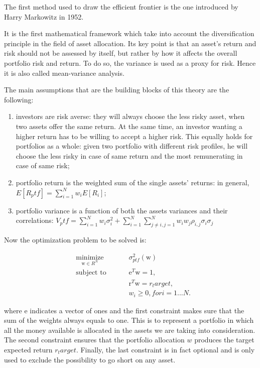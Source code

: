 The first method used to draw the efficient frontier is the one introduced by Harry Markowitz in 1952.

It is the first mathematical framework which take into account the diversification principle in the field of asset allocation. Its key point is that an asset's return and risk should not be assessed by itself, but rather by how it affects the overall portfolio risk and return. To do so, the variance is used as a proxy for risk. Hence it is also called mean-variance analysis.

The main assumptions that are the building blocks of this theory are the following:
\begin{enumerate}
    \item investors are risk averse: they will always choose the less risky asset, when two assets offer the same return. At the same time, an investor wanting a higher return has to be willing to accept a higher risk. This equally holds for portfolios as a whole: given two portfolio with different risk profiles, he will choose the less risky in case of same return and the most remunerating in case of same risk;
    \item portfolio return is the weighted sum of the single assets' returns: in general, $E\left[ R_ptf\right] = \sum_{{i=1}}^{N} w_i E\left[ R_i\right]$;
    \item portfolio variance is a function of both the assets variances and their correlations: $V_ptf = \sum_{{i=1}}^{N}w_i \sigma_i^2 + \sum_{{i=1}}^{N} \sum_{{j \neq i, }{j = 1}}^{N} w_i w_j \rho_{i,j} \sigma_i \sigma_j $
\end{enumerate}
Now the optimization problem to be solved is:

\begin{equation*}
\begin{aligned}
& \underset{\text{w} \in R^N}{\text{minimize}}
& & & & \sigma_{ptf}^2\left(\text{w}\right) \\
& \text{subject to}
& & & & \text{e}^T \text{w} = 1 \text{,} \\
&&&&& \text{r}^T \text{w} = r_target \text{,} \\
&&&&& w_i \geq 0, for i = 1...N \text{.}
\end{aligned}
\end{equation*}

where e indicates a vector of ones and the first constraint makes sure that the sum of the weights always equals to one. This is to represent a portfolio in which all the money available is allocated in the assets we are taking into consideration. The second constraint ensures that the portfolio allocation $w$ produces the target expected return $r_target$. Finally, the last constraint is in fact optional and is only used to exclude the possibility to go short on any asset.

